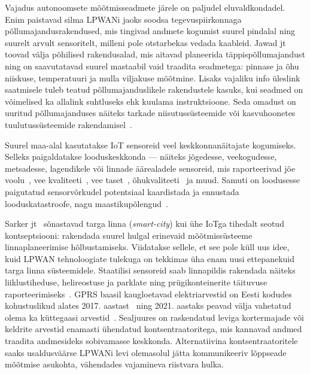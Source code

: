 \documentclass[12pt]{article}
\begin{document}
    Vajadus autonoomsete mõõtmisseadmete järele on paljudel eluvaldkondadel.
    Enim paistavad silma LPWANi jaoks soodsa tegevuspiirkonnaga põllumajandusrakendused, mis tingivad andmete kogumist suurel pindalal ning suurelt arvult sensoritelt, milleni pole otstarbekas vedada kaableid.
    Jawad jt~\cite{jawad2017energy} toovad välja põhilised rakendusalad, mis aitavad planeerida täppispõllumajandust ning on saavutatavad suurel mastaabil vaid traadita seadmetega: pinnase ja õhu niiskuse, temperatuuri ja mulla viljakuse mõõtmine.
    Lisaks vajaliku info üleslink saatmisele tuleb teatud põllumajanduslikele rakendustele kasuks, kui seadmed on võimelised ka allalink suhtluseks ehk kuulama instruktsioone.
    Seda omadust on uuritud põllumajanduses näiteks tarkade niisutussüsteemide või kasvuhoonetes tuulutussüsteemide rakendamisel~\cite{abba2019design}.

    Suurel maa-alal kasutatakse IoT sensoreid veel keskkonnanäitajate kogumiseks.
    Selleks paigaldatakse looduskeskkonda — näiteks jõgedesse, veekogudesse, metsadesse, lagendikele või linnade äärealadele sensoreid, mis raporteerivad jõe voolu~\cite{guibene2017evaluation}, vee kvaliteeti~\cite{liu2018solar}, vee taset~\cite{moreno2019rivercore}, õhukvaliteeti~\cite{knoll2018low} ja muud.
    Samuti on loodusesse paigutatud sensorvõrkudel potentsiaal kaardistada ja ennustada looduskatastroofe, nagu maastikupõlengud~\cite{kang}.

    Sarker jt~\cite{sarker2019survey} sõnastavad targa linna (\textit{smart-city}) kui ühe IoTga tihedalt seotud kontseptsiooni: rakendada suurel hulgal erinevaid mõõtmissüsteeme linnaplaneerimise hõlbustamiseks.
    Viidatakse sellele, et see pole küll uus idee, kuid LPWAN tehnoloogiate tulekuga on tekkimas üha enam uusi ettepanekuid targa linna süsteemidele.
    Staatilisi sensoreid saab linnapildis rakendada näiteks liiklustiheduse, helireostuse ja parklate ning prügikonteinerite täituvuse raporteerimiseks~\cite{zanella}.
    GPRS baasil kaugloetavad elektriarvestid on Eesti kodudes kohustuslikud alates 2017. aastast~\cite{laurit} ning 2021. aastaks peavad välja vahetatud olema ka küttegaasi arvestid~\cite{gaas}.
    Sealjuures on raskendatud leviga kortermajade või keldrite arvestid enamasti ühendatud kontsentraatoritega, mis kannavad andmed traadita andmesideks sobivamasse keskkonda.
    Alternatiivina kontsentraatoritele saaks usaldusväärse LPWANi levi olemasolul jätta kommunikeeriv lõppseade mõõtmise asukohta, vähendades vajamineva riistvara hulka.
\end{document}

